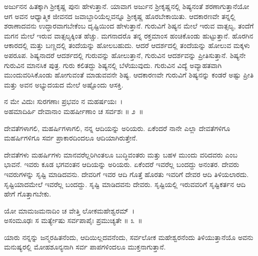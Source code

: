 ಅರ್ಜುನನ ಹಿತಕ್ಕಾಗಿ ಶ‍್ರೀಕೃಷ್ಣ ಪುನಃ ಹೇಳುತ್ತಾನೆ. ಯಾವಾಗ ಅರ್ಜುನ ಶ‍್ರೀಕೃಷ್ಣನಲ್ಲಿ ಶಿಷ್ಯನಂತೆ ಶರಣಾಗುತ್ತಾನೆಯೋ ಆಗ ಅವನ ಆಧ್ಯಾತ್ಮಿಕ ಜೀವನದ ಜವಾಬ್ದಾರಿಯೆಲ್ಲವನ್ನೂ ಶ‍್ರೀಕೃಷ್ಣ ಹೊರಬೇಕಾಯಿತು. ಆದಕಾರಣವೇ ತನ್ನಲ್ಲಿ ಶರಾಣಾದವನು ಉದ್ಧಾರವಾಗಬೇಕೆಂಬ ದೃಷ್ಟಿಯಿಂದ ಹೇಳುತ್ತಾನೆ. ಗುರುವಿಗೆ ಶಿಷ್ಯನ ಮೇಲೆ ಇರುವ ವಾತ್ಸಲ್ಯ, ತಂದೆಗೆ ಮಗನ ಮೇಲೆ ಇರುವ ವಾತ್ಸಲ್ಯಕ್ಕಿಂತ ಹೆಚ್ಚು. ಮಗನಾದರೊ ತನ್ನ ರಕ್ತಮಾಂಸ ಹಂಚಿಕೊಂಡು ಹುಟ್ಟುತ್ತಾನೆ. ಹೊರಗಿನ ಆಕಾರದಲ್ಲಿ ಮತ್ತು ಬಣ್ಣದಲ್ಲಿ ತಂದೆಯನ್ನು ಹೋಲಬಹುದು. ಆದರೆ ಆದರ್ಶದಲ್ಲಿ ತಂದೆಯನ್ನು ಹೋಲುವ ಮಕ್ಕಳು ಅಪರೂಪ. ಶಿಷ್ಯನಾದರೆ ಆದರ್ಶದಲ್ಲಿ ಗುರುವನ್ನು ಹೋಲುತ್ತಾನೆ, ಗುರುವಿನ ಆದರ್ಶವನ್ನು ಪ್ರೀತಿಸುತ್ತಾನೆ. ಶಿಷ್ಯನೇ ಗುರುವಿನ ಮಾನಸಿಕ ಪುತ್ರ. ಗುರು ಕಲಿತದ್ದು ಶಿಷ್ಯನಲ್ಲಿ ಬೆಳೆಯುವುದು. ಗುರುವಿನ ವಿದ್ಯೆ ಅವ್ಯಾಹತವಾಗಿ ಮುಂದುವರಿಸಿಕೊಂಡು ಹೋಗುವಂತೆ ಮಾಡುವವನೇ ಶಿಷ್ಯ. ಆದಕಾರಣವೇ ಗುರುವಿಗೆ ಶಿಷ್ಯನನ್ನು ಕಂಡರೆ ಅಷ್ಟು ಪ್ರೀತಿ ಮತ್ತು ಅವನ ಅಭ್ಯುದಯದ ಮೇಲೆ ಅಷ್ಟೊಂದು ಆಸಕ್ತಿ.

\begin{shloka}
ನ ಮೇ ವಿದುಃ ಸುರಗಣಾಃ ಪ್ರಭವಂ ನ ಮಹರ್ಷಯಃ~।\\ಅಹಮಾದಿರ್ಹಿ ದೇವಾನಾಂ ಮಹರ್ಷೀಣಾಂ ಚ ಸರ್ವಶಃ \hfill॥ ೨~॥
\end{shloka}

\begin{artha}
ದೇವತೆಗಳಾಗಲಿ, ಮಹರ್ಷಿಗಳಾಗಲಿ, ನನ್ನ ಆದಿಯನ್ನು ಅರಿಯರು. ಏಕೆಂದರೆ ನಾನೇ ಎಲ್ಲಾ ದೇವತೆಗಳಿಗೂ ಮಹರ್ಷಿಗಳಿಗೂ ಸರ್ವ ಪ್ರಾಕಾರದಿಂದಲೂ ಆದಿಯಾಗಿರುತ್ತೇನೆ.
\end{artha}

ದೇವತೆಗಳು ಮಹರ್ಷಿಗಳು ಮಾನವರೆಲ್ಲರಿಗಿಂತಲೂ ಬುದ್ಧಿವಂತರು ಮತ್ತು ಬಹಳ ಮುಂದು ವರಿದವರು ಎಂಬ ಭಾವನೆ. ಇವರು ಕೂಡ ಭಗವಂತನ ಆದಿಯನ್ನು ಅರಿಯರು. ಏಕೆಂದರೆ ಇವರೆಲ್ಲ ಬಂದದ್ದು ಅನಂತರ. ದೇವರು ಇವರುಗಳನ್ನು ಸೃಷ್ಟಿ ಮಾಡಿದವನು. ದೇವರಿಗೆ ಇವರ ಆದಿ ಗೊತ್ತೆ ಹೊರತು ಇವರಿಗೆ ದೇವರ ಆದಿ ತಿಳಿಯಲಾರದು. ಸೃಷ್ಟಿಯಾದಮೇಲೆ ಇವರೆಲ್ಲ ಬಂದದ್ದು. ಸೃಷ್ಟಿ ಮಾಡಿದವನು ದೇವರು. ಸೃಷ್ಟಿಯಲ್ಲಿ ಇರುವವರಿಗೆ ಸೃಷ್ಟಿಕರ್ತನ ಆದಿ ಹೇಗೆ ಗೊತ್ತಾಗಬೇಕು.

\begin{shloka}
ಯೋ ಮಾಮಜಮನಾದಿಂ ಚ ವೇತ್ತಿ ಲೋಕಮಹೇಶ್ವರಮ್~।\\ಅಸಂಮೂಢಃ ಸ ಮರ್ತ್ಯೇಷು ಸರ್ವಪಾಪೈಃ ಪ್ರಮುಚ್ಯತೇ \hfill॥ ೩~॥
\end{shloka}

\begin{artha}
ಯಾರು ನನ್ನನ್ನು ಜನ್ಮರಹಿತನೆಂದು, ಆದಿಯಿಲ್ಲದವನೆಂದು, ಸರ್ವಲೋಕ ಮಹೇಶ್ವರನೆಂದು ತಿಳಿಯುತ್ತಾನೆಯೊ ಅವನು ಮನುಷ್ಯರಲ್ಲಿ ಮೋಹಶೂನ್ಯನಾಗಿ ಸರ್ವ ಪಾಪಗಳಿಂದಲೂ ಮುಕ್ತ\-ನಾಗುತ್ತಾನೆ.
\end{artha}

